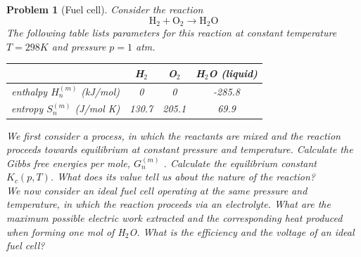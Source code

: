 \documentclass[a4paper]{article}
\theoremstyle{new2}
\theoremstyle{new}
\newtheorem{qns}{Problem}[section]
\begin{document}
\newpage
\begin{qns}[Fuel cell]
Consider the reaction
$$\text{H}_2+\text{O}_2\rightarrow\text{H}_2\text{O}$$
The following table lists parameters for this reaction at constant temperature $T = 298 K$ and pressure $p = 1$ atm.
\begin{center}
\begin{tabular}{|c|c|c|c|}
\hline
         & H$_2$    & O$_2$    & H$_2$O (liquid)      \\
         \hline
enthalpy $H_n^{(m)}$ (kJ/mol) & 0     & 0     & -285.8   \\
\hline
entropy $S_n^{(m)}$ (J/mol K) & 130.7 & 205.1 & 69.9    \\
\hline
\end{tabular}
\end{center}
We first consider a process, in which the reactants are mixed and the reaction proceeds towards equilibrium at constant pressure and temperature. Calculate the Gibbs free energies per mole, $G_n^{(m)}$ . Calculate the equilibrium constant $K_c(p,T)$. What does its value tell us about the nature of the reaction?\\[5pt]
We now consider an ideal fuel cell operating at the same pressure and temperature, in which the reaction proceeds via an electrolyte. What are the maximum possible electric work extracted and the corresponding heat produced when forming one mol of H$_2$O. What is the efficiency and the voltage of an ideal fuel cell?
\end{qns}
\end{document}
